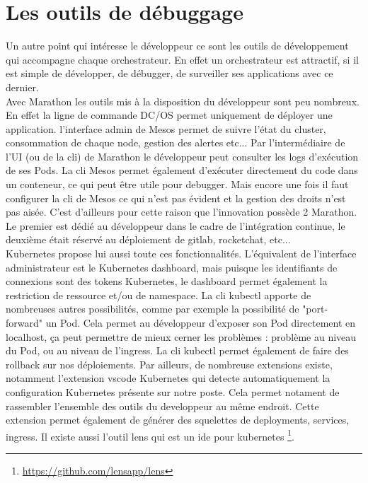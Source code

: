 \documentclass[11pt,fleqn]{book} %
\begin{document}
\section{Les outils de débuggage}
Un autre point qui intéresse le développeur ce sont les outils de développement qui accompagne chaque orchestrateur. En effet un orchestrateur est attractif, si il est simple de développer, de débugger, de surveiller ses applications avec ce dernier.\\

Avec Marathon les outils mis à la disposition du développeur sont peu nombreux. En effet la ligne de commande DC/OS permet uniquement de déployer une application. l'interface admin de Mesos permet de suivre l'état du cluster, consommation de chaque node, gestion des alertes etc... Par l'intermédiaire de l'UI (ou de la cli) de Marathon le développeur peut consulter les logs d'exécution de ses Pods. La cli Mesos permet également d'exécuter directement du code dans un conteneur, ce qui peut être utile pour debugger. Mais encore une fois il faut configurer la cli de Mesos ce qui n'est pas évident et la gestion des droits n'est pas aisée. C'est d'ailleurs pour cette raison que l'innovation possède 2 Marathon. Le premier est dédié au développeur dans le cadre de l'intégration continue, le deuxième était réservé au déploiement de gitlab, rocketchat, etc... \\

Kubernetes propose lui aussi toute ces fonctionnalités. L'équivalent de l'interface administrateur est le Kubernetes dashboard, mais puisque les identifiants de connexions sont des tokens Kubernetes, le dashboard permet également la restriction de ressource et/ou de namespace. La cli kubectl apporte de nombreuses autres possibilités, comme par exemple la possibilité de "port-forward" un Pod. Cela permet au développeur d'exposer son Pod directement en localhost, ça peut permettre de mieux cerner les problèmes : problème au niveau du Pod, ou au niveau de l'ingress. La cli kubectl permet également de faire des rollback sur nos déploiements. Par ailleurs, de nombreuse extensions existe, notamment l'extension vscode Kubernetes qui detecte automatiquement la configuration Kubernetes présente sur notre poste.  Cela permet notament de rassembler l'ensemble des outils du developpeur au même endroit. Cette extension permet également de générer des squelettes de deployments, services, ingress. Il existe aussi l'outil lens qui est un ide pour kubernetes \footnote{\url{
https://github.com/lensapp/lens}}.
\end{document}
